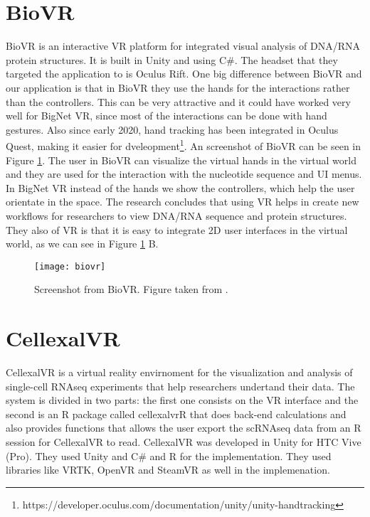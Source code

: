 \section{BioVR}
BioVR is an interactive VR platform for integrated visual analysis of DNA/RNA protein structures\cite{biovr}. It is built in Unity and using C\#. The headset that they targeted the application to is Oculus Rift. One big difference between BioVR and our application is that in BioVR they use the hands for the interactions rather than the controllers. This can be very attractive and it could have worked very well for BigNet VR, since most of the interactions can be done with hand gestures. Also since early 2020, hand tracking has been integrated in Oculus Quest, making it easier for dveleopment\footnote{https://developer.oculus.com/documentation/unity/unity-handtracking}.
An screenshot of BioVR can be seen in Figure \ref{fig:biovr}. The user in BioVR can visualize the virtual hands in the virtual world and they are used for the interaction with the nucleotide sequence and UI menus. In BigNet VR instead of the hands we show the controllers, which help the user orientate in the space. The research concludes that using VR helps in create new workflows for researchers to view DNA/RNA sequence and protein structures. They also  of VR is that it is easy to integrate 2D user interfaces in the virtual world, as we can see in Figure \ref{fig:biovr} B.

\begin{figure}[h!]
    \centering%
    \texttt{[image: biovr]}
    \caption{Screenshot from BioVR. Figure taken from \cite{biovr}.}
    \label{fig:biovr}
\end{figure}%

\section{CellexalVR}
CellexalVR is a virtual reality envirnoment for the visualization and analysis of single-cell RNAseq experiments that help researchers undertand their data\cite{cellexalvr}. The system is divided in two parts: the first one consists on the VR interface and the second is an R package called cellexalvrR that does back-end calculations and also provides functions that allows the user export the scRNAseq data from an R session for CellexalVR to read. CellexalVR was developed in Unity for HTC Vive (Pro). They used Unity and C\# and R for the implementation. They used libraries like VRTK, OpenVR and SteamVR as well in the implemenation.

